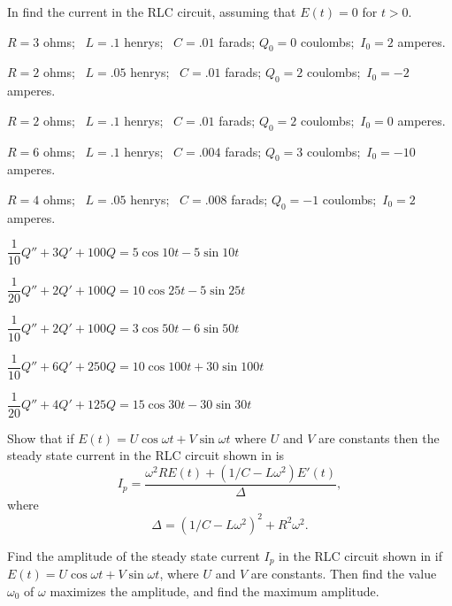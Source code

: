 \exercises
In  find the current in the
RLC circuit, assuming that $E(t)=0$ for $t>0$.

\begin{exerciselist}
\item\label{exer:6.3.1}$R=3$ ohms;  \, $L=.1$ henrys;  \, $C=.01$ farads;   $Q_0=0$
coulombs;  \,$I_0=2$ amperes.

\item\label{exer:6.3.2}$R=2$ ohms;  \, $L=.05$ henrys;  \, $C=.01$ farads;  $Q_0=2$
coulombs;  \,$I_0=-2$ amperes.

\item\label{exer:6.3.3}$R=2$ ohms;  \, $L=.1$ henrys;  \, $C=.01$ farads;   $Q_0=2$
coulombs;  \,$I_0=0$ amperes.

\item\label{exer:6.3.4}$R=6$ ohms;  \, $L=.1$ henrys;  \, $C=.004$ farads;  $Q_0=3$
coulombs;  \,$I_0=-10$ amperes.

\item\label{exer:6.3.5}$R=4$ ohms;  \, $L=.05$ henrys;  \, $C=.008$ farads;   $Q_0=-1$
coulombs;  \,$I_0=2$ amperes.



\item\label{exer:6.3.6}$\dfrac{1}{10}Q''+3Q'+100Q=5\cos10t-5\sin10t$

\item\label{exer:6.3.7}$\dfrac{1}{20}Q''+2Q'+100Q=10\cos25t-5\sin25t$

\item\label{exer:6.3.8}$\dfrac{1}{10}Q''+2Q'+100Q=3\cos50t-6\sin50t$

\item\label{exer:6.3.9}$\dfrac{1}{10}Q''+6Q'+250Q=10\cos100t+30\sin100t$

\item\label{exer:6.3.10}$\dfrac{1}{20}Q''+4Q'+125Q=15\cos30t-30\sin30t$

\item\label{exer:6.3.11}Show that if $E(t)=U\cos\omega t+V\sin\omega t$ where $U$
and $V$ are constants then the steady state current in
the RLC circuit shown in  is
\[
I_p=\frac{\omega^2RE(t)+(1/C-L\omega^2)E'(t)}{\Delta},
\]
where
\[
\Delta=(1/C-L\omega^2)^2+R^2\omega^2.
\]

\item\label{exer:6.3.12}Find the amplitude of the steady state current $I_p$ in the RLC
circuit shown in   if $E(t)=U\cos\omega
t+V\sin\omega t$, where $U$ and $V$ are constants. Then find the value
$\omega_0$ of $\omega$ maximizes the amplitude, and
 find the maximum amplitude.


\end{exerciselist}
